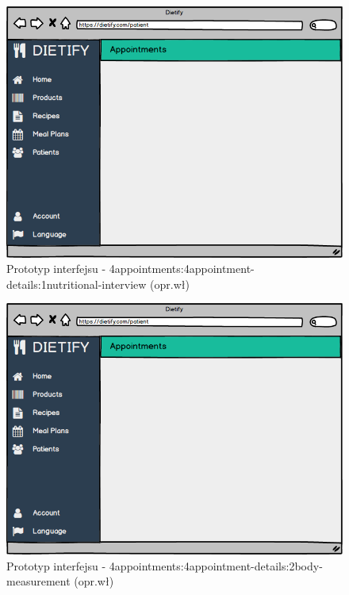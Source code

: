 \begin{minipage}{\textwidth}
    \begin{figure}[H]
        \centering\includegraphics[scale=0.55]{../mockup/4appointments_4appointment-details_1nutritional-interview.png}
        \caption{Prototyp interfejsu - 4appointments:4appointment-details:1nutritional-interview (opr.wł)}\label{rysunek:4appointments_4appointment-details_1nutritional-interview}
    \end{figure}
\end{minipage}
\begin{minipage}{\textwidth}
    \begin{figure}[H]
        \centering\includegraphics[scale=0.55]{../mockup/4appointments_4appointment-details_2body-measurement.png}
        \caption{Prototyp interfejsu - 4appointments:4appointment-details:2body-measurement (opr.wł)}\label{rysunek:4appointments_4appointment-details_2body-measurement}
    \end{figure}
\end{minipage}

